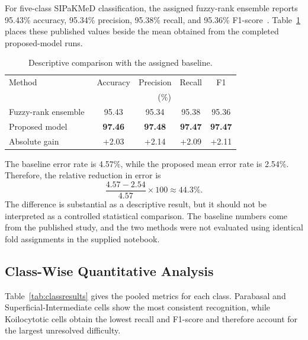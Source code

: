 \documentclass[10pt,conference]{IEEEtran}
\begin{document}
For five-class SIPaKMeD classification, the assigned fuzzy-rank ensemble reports 95.43\% accuracy, 95.34\% precision, 95.38\% recall, and 95.36\% F1-score~\cite{manna2021}. Table~\ref{tab:baseline} places these published values beside the mean obtained from the completed proposed-model runs.

\begin{table}[!t]
\caption{Descriptive comparison with the assigned baseline.}
\label{tab:baseline}
\centering
\scriptsize
\setlength{\tabcolsep}{3pt}
\begin{tabular}{lcccc}
\toprule
Method & Accuracy & Precision & Recall & F1\\
 & \multicolumn{4}{c}{(\%)}\\
\midrule
Fuzzy-rank ensemble~\cite{manna2021} & 95.43 & 95.34 & 95.38 & 95.36\\
Proposed model & \textbf{97.46} & \textbf{97.48} & \textbf{97.47} & \textbf{97.47}\\
\midrule
Absolute gain & +2.03 & +2.14 & +2.09 & +2.11\\
\bottomrule
\end{tabular}
\end{table}

The baseline error rate is 4.57\%, while the proposed mean error rate is 2.54\%. Therefore, the relative reduction in error is
\begin{equation}
\frac{4.57-2.54}{4.57}\times100\approx44.3\%.
\end{equation}
The difference is substantial as a descriptive result, but it should not be interpreted as a controlled statistical comparison. The baseline numbers come from the published study, and the two methods were not evaluated using identical fold assignments in the supplied notebook.

\subsection{Class-Wise Quantitative Analysis}

Table~\ref{tab:classresults} gives the pooled metrics for each class. Parabasal and Superficial-Intermediate cells show the most consistent recognition, while Koilocytotic cells obtain the lowest recall and F1-score and therefore account for the largest unresolved difficulty.
\end{document}
